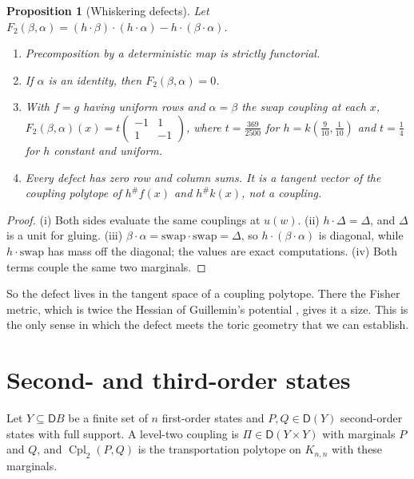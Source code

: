 \documentclass[11pt]{article}
\newtheorem{proposition}[theorem]{Proposition}
\theoremstyle{definition}
\theoremstyle{remark}
\newcommand{\D}{\mathsf{D}}
\newcommand{\Cpl}{\operatorname{Cpl}}
\begin{document}
\begin{proposition}[Whiskering defects]\label{prop:defect}
Let $F_2(\beta,\alpha)=(h\cdot\beta)\cdot(h\cdot\alpha)-h\cdot(\beta\cdot\alpha)$.
\begin{enumerate}[label=(\roman*)]
\item Precomposition by a deterministic map is strictly functorial.
\item If $\alpha$ is an identity, then $F_2(\beta,\alpha)=0$.
\item With $f=g$ having uniform rows and $\alpha=\beta$ the swap coupling at each $x$,
  $F_2(\beta,\alpha)(x)=t\left(\begin{smallmatrix}-1&1\\1&-1\end{smallmatrix}\right)$, where $t=\tfrac{369}{2500}$ for
  $h=k(\tfrac9{10},\tfrac1{10})$ and $t=\tfrac14$ for $h$ constant and uniform.
\item Every defect has zero row and column sums. It is a tangent vector of the coupling polytope of
  $h^\#f(x)$ and $h^\#k(x)$, not a coupling.
\end{enumerate}
\end{proposition}
\begin{proof}
(i) Both sides evaluate the same couplings at $u(w)$. (ii) $h\cdot\Delta=\Delta$, and $\Delta$ is a unit for
gluing. (iii) $\beta\cdot\alpha=\mathrm{swap}\cdot\mathrm{swap}=\Delta$, so $h\cdot(\beta\cdot\alpha)$ is diagonal,
while $h\cdot\mathrm{swap}$ has mass off the diagonal; the values are exact computations. (iv) Both terms
couple the same two marginals.
\end{proof}

So the defect lives in the tangent space of a coupling polytope. There the Fisher metric, which is
twice the Hessian of Guillemin's potential \cite[Prop.~6.5]{Conditionals}, gives it a size. This is the
only sense in which the defect meets the toric geometry that we can establish.

\section{Second- and third-order states}\label{sec:levels}

Let $Y\subseteq\D B$ be a finite set of $n$ first-order states and $P,Q\in\D(Y)$ second-order states with full
support. A level-two coupling is $\Pi\in\D(Y\times Y)$ with marginals $P$ and $Q$, and $\Cpl_2(P,Q)$ is the
transportation polytope on $K_{n,n}$ with these marginals.
\end{document}
